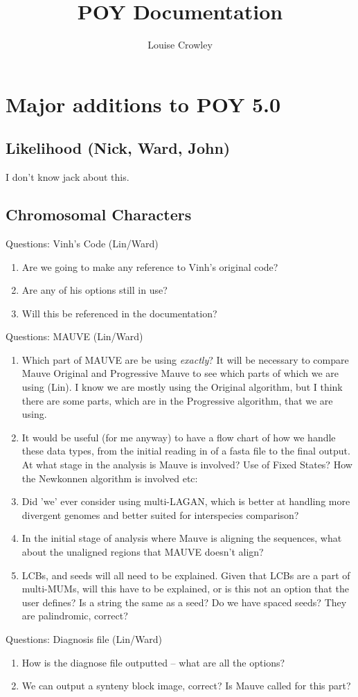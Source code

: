 \documentclass[11pt]{article}
\title{POY Documentation}
\author{Louise Crowley}
\begin{document}
\maketitle

\section{Major additions to POY 5.0}
\subsection{Likelihood (Nick, Ward, John)}
\bigskip
I don't know jack about this.
\subsection{Chromosomal Characters}
\bigskip

Questions: Vinh's Code (Lin/Ward)
\begin{enumerate}
\item{Are we going to make any reference to Vinh's original code?}  
\item{Are any of his options still in use?}
\item{Will this be referenced in the documentation?}
\end{enumerate}
\bigskip
Questions: MAUVE (Lin/Ward)
\begin{enumerate}
\item{Which part of MAUVE are be using \emph{exactly}? It will be necessary to compare Mauve Original and Progressive Mauve to see which parts of which we are using (Lin).  I know we are mostly using the Original algorithm, but I think there are some parts, which are in the Progressive algorithm, that we are using.}
\item{It would be useful (for me anyway) to have a flow chart of how we handle these data types, from the initial reading in of a fasta file to the final output.  At what stage in the analysis is Mauve is involved?  Use of Fixed States? How the Newkonnen algorithm is involved etc:}
\item{Did 'we' ever consider using multi-LAGAN, which is better at handling more divergent genomes and better suited for interspecies comparison?}
\item{In the initial stage of analysis where Mauve is aligning the sequences, what about the unaligned regions that MAUVE doesn't align?}
\item{LCBs, and seeds will all need to be explained.  Given that LCBs are a part of multi-MUMs, will this have to be explained, or is this not an option that the user defines? Is a string the same as a seed?  Do we have spaced seeds?  They are palindromic, correct?} 
\end{enumerate}
\bigskip
Questions: Diagnosis file (Lin/Ward)
\begin{enumerate}
\item{How is the diagnose file outputted -- what are all the options?}
\item{We can output a synteny block image, correct? Is Mauve called for this part?}
\end{enumerate}
\bigskip
\end{document}
